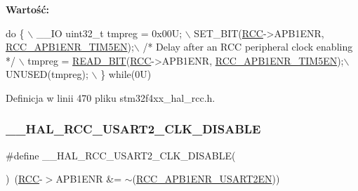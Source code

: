 {\bfseries Wartość\+:}
\begin{DoxyCode}
\textcolor{keywordflow}{do} \{ \(\backslash\)
                                        \_\_IO uint32\_t tmpreg = 0x00U; \(\backslash\)
                                        SET\_BIT(\hyperlink{group___peripheral__declaration_ga74944438a086975793d26ae48d5882d4}{RCC}->APB1ENR, 
      \hyperlink{group___peripheral___registers___bits___definition_ga49abbbc8fd297c544df2d337b28f80e4}{RCC\_APB1ENR\_TIM5EN});\(\backslash\)
                                        \textcolor{comment}{/* Delay after an RCC peripheral clock enabling */} \(\backslash\)
                                        tmpreg = \hyperlink{group___exported__macro_ga822bb1bb9710d5f2fa6396b84e583c33}{READ\_BIT}(\hyperlink{group___peripheral__declaration_ga74944438a086975793d26ae48d5882d4}{RCC}->APB1ENR, 
      \hyperlink{group___peripheral___registers___bits___definition_ga49abbbc8fd297c544df2d337b28f80e4}{RCC\_APB1ENR\_TIM5EN});\(\backslash\)
                                        UNUSED(tmpreg); \(\backslash\)
                                          \} \textcolor{keywordflow}{while}(0U)
\end{DoxyCode}


Definicja w linii 470 pliku stm32f4xx\+\_\+hal\+\_\+rcc.\+h.

\mbox{\label{group___r_c_c___a_p_b1___clock___enable___disable_ga1edc6c83fbebf8b4265ef9500aa04b04}} 
\subsubsection{\texorpdfstring{\+\_\+\+\_\+\+H\+A\+L\+\_\+\+R\+C\+C\+\_\+\+U\+S\+A\+R\+T2\+\_\+\+C\+L\+K\+\_\+\+D\+I\+S\+A\+B\+LE}{\_\_HAL\_RCC\_USART2\_CLK\_DISABLE}}
{\footnotesize\ttfamily \#define \+\_\+\+\_\+\+H\+A\+L\+\_\+\+R\+C\+C\+\_\+\+U\+S\+A\+R\+T2\+\_\+\+C\+L\+K\+\_\+\+D\+I\+S\+A\+B\+LE(\begin{DoxyParamCaption}{ }\end{DoxyParamCaption})~(\hyperlink{group___peripheral__declaration_ga74944438a086975793d26ae48d5882d4}{R\+CC}-\/$>$A\+P\+B1\+E\+NR \&= $\sim$(\hyperlink{group___peripheral___registers___bits___definition_gab840af4f735ec36419d61c7db3cfa00d}{R\+C\+C\+\_\+\+A\+P\+B1\+E\+N\+R\+\_\+\+U\+S\+A\+R\+T2\+EN}))}



